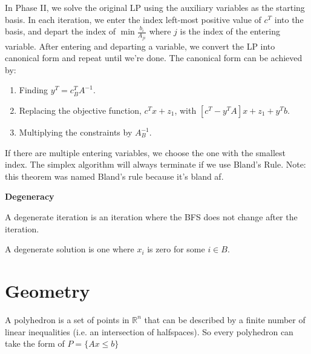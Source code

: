 \documentclass[a4paper]{report}
\begin{document}
\begin{definition}
  In Phase II, we solve the original LP using the auxiliary variables as the starting basis. In each iteration, we enter the index left-most positive value of $c^T$ into the basis, and depart the index of $\min \frac {b_i} {A_{ji}}$ where $j$ is the index of the entering variable. After entering and departing a variable, we convert the LP into canonical form and repeat until we're done. The canonical form can be achieved by:
  \begin{enumerate}
    \item Finding $y^T = c_B^T A^{-1}$.
    \item Replacing the objective function, $c^T x + z_1$, with $[c^T - y^T A]x + z_1 + y^T b$.
    \item Multiplying the constraints by $A_B^{-1}$.
  \end{enumerate}
\end{definition}

\begin{theorem}
  If there are multiple entering variables, we choose the one with the smallest index. The simplex algorithm will always terminate if we use Bland's Rule. Note: this theorem was named Bland's rule because it's bland af.
\end{theorem}

\begin{definition*}
  \textbf{Degeneracy}
\item \begin{definition}\label{degeneracy:i}
  A degenerate iteration is an iteration where the BFS does not change after the iteration.
\end{definition}

\item \begin{definition}\label{degeneracy:ii}
  A degenerate solution is one where $x_i$ is zero for some $i \in B$.
\end{definition}

\end{definition*}

\section{Geometry}
\begin{definition}[Polyhedron]
  A polyhedron is a set of points in $\mathbb R^n$ that can be described by a finite number of linear inequalities (i.e. an intersection of halfspaces). So every polyhedron can take the form of $P = \{Ax \leq b\}$
\end{definition}
\end{document}
